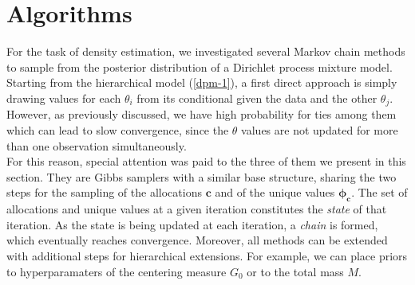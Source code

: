 \section{Algorithms}
For the task of density estimation, we investigated several Markov chain methods to sample from the posterior distribution of a Dirichlet process mixture model. \\
Starting from the hierarchical model (\ref{dpm-1}), a first direct approach is simply drawing values for each $\theta_i$ from its conditional given the data and the other $\theta_j$.
However, as previously discussed, we have high probability for ties among them which can lead to slow convergence, since the $\theta$ values are not updated for more than one observation simultaneously. \\
For this reason, special attention was paid to the three of them we present in this section.
They are Gibbs samplers with a similar base structure, sharing the two steps for the sampling of the allocations $\mathbf{c}$ and of the unique values $\mathbf{\phi_c}$.
The set of allocations and unique values at a given iteration constitutes the \emph{state} of that iteration.
As the state is being updated at each iteration, a \emph{chain} is formed, which eventually reaches convergence. %
Moreover, all methods can be extended with additional steps for hierarchical extensions.
For example, we can place priors to hyperparamaters of the centering measure $G_0$ or to the total mass $M$.


